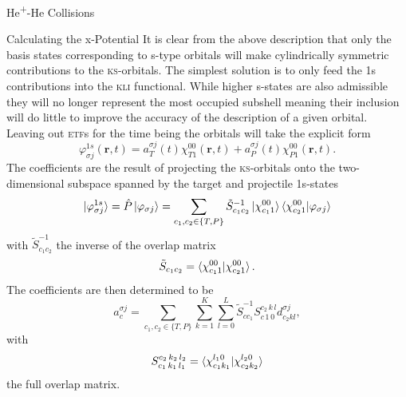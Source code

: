 \documentclass[letterpaper, 11 pt]{report}
\begin{document}
\begin{chapter}{\texorpdfstring{He\textsuperscript{+}}{He+}-He Collisions \label{chap:hephe}}
\begin{section}{Calculating the x-Potential \label{sec:pot}}
      It is clear from the above description that only the basis states corresponding to s-type orbitals
      will make cylindrically symmetric contributions to the \textsc{ks}-orbitals. The simplest solution
      is to only feed the 1s contributions into the \textsc{kli} functional. While higher s-states are
      also admissible they will no longer represent the most occupied subshell meaning their inclusion
      will do little to improve the accuracy of the description of a given orbital. Leaving out
      \textsc{etf}s for the time being the orbitals will take the explicit form
      \begin{equation} \label{eq:1sonly}
         \varphi_{\sigma j}^{1s}(\mathbf{r},t) = a^{\sigma j}_T(t) \chi^{00}_{T1}(\mathbf{r},t)
                                               + a^{\sigma j}_P(t) \chi^{00}_{P1}(\mathbf{r},t).
      \end{equation}
      The coefficients are the result of projecting the \textsc{ks}-orbitals onto the two-dimensional
      subspace spanned by the target and projectile 1s-states
      \begin{equation} \label{eq:proj}
         \ket{\varphi^{1s}_{\sigma j}} = \hat{P} \ket{\varphi_{\sigma j}}
                                       = \sum\limits_{c_1, c_2 \in \{T,P\}} \tilde{S}^{-1}_{c_1 c_2}
                                                      \ket{\chi^{00}_{c_1 1}}
                                                      \braket{\chi^{00}_{c_2 1}| \varphi_{\sigma j}}
      \end{equation}
      with $\tilde{S}^{-1}_{c_1 c_2}$ the inverse of the overlap matrix
      \begin{equation} \label{eq:overlap2d}
         \tilde{S}_{c_1 c_2} = \braket{ \chi^{00}_{c_1 1} | \chi^{00}_{c_2 1} }.
      \end{equation}
      The coefficients are then determined to be
      \begin{equation} \label{eq:coef}
         a^{\sigma j}_c = \sum\limits_{c_1, c_2 \in \{T,P\}} \sum\limits_{k = 1}^K
                          \sum\limits_{l = 0}^L \tilde{S}^{-1}_{c c_1} S^{c_2 \, k \, l}_{c \, 1 \, 0}
                             d^{\sigma j}_{c_2 k l},
      \end{equation}
      with
      \begin{equation} \label{eq:overlap}
         S_{c_1 \, k_1 \, l_1 }^{c_2 \, k_2 \, l_2 } =
            \braket{ \chi^{l_1 0}_{c_1 k_1} | \chi^{l_2 0}_{c_2 k_2} }
      \end{equation}
      the full overlap matrix.


\end{section}
\end{chapter}
\end{document}
